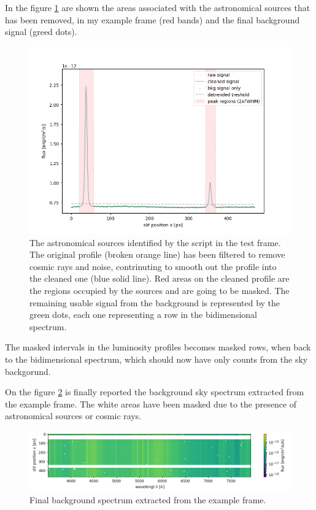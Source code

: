 \begin{enumerate}
	In the figure \ref{fig:removed} are shown the areas associated with the astronomical sources that has been removed, in my example frame (red bands) and the final background signal (greed dots).
	\begin{figure}[h!]
		\centering
		\includegraphics[width=.85\textwidth]{./5_mywork/removed}
		\caption{The astronomical sources identified by the script in the test frame. The original profile (broken orange line) has been filtered to remove cosmic rays and noise, contrinuting to smooth out the profile into the cleaned one (blue solid line). Red areas on the cleaned profile are the regions occupied by the sources and are going to be masked. The remaining usable signal from the background is represented by the green dots, each one representing a row in the bidimensional spectrum. \label{fig:removed}}
	\end{figure}
\end{enumerate}
The masked intervals in the luminosity profiles becomes masked rows, when back to the bidimensional spectrum, which should now have only counts from the sky backgorund.

On the figure \ref{fig:clean_spec} is finally reported the background sky spectrum extracted from the example frame. The white areas have been masked due to the presence of astronomical sources or cosmic rays.
\begin{figure}[h!]
	\centering
	\includegraphics[width=\textwidth]{./5_mywork/clean_spec}
	\caption{Final background spectrum extracted from the example frame.\label{fig:clean_spec}}
\end{figure}


